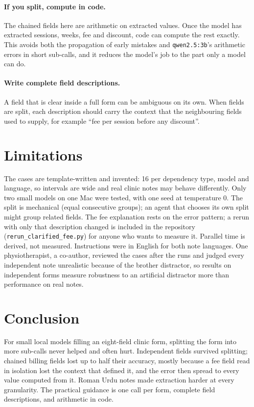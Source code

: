 \documentclass[11pt,a4paper]{article}
\newcommand{\code}[1]{\texttt{#1}}
\begin{document}
\paragraph{If you split, compute in code.} The chained fields here are arithmetic on extracted values. Once the model
has extracted sessions, weeks, fee and discount, code can compute the rest exactly. This avoids both the propagation of
early mistakes and \code{qwen2.5:3b}'s arithmetic errors in short sub-calls, and it reduces the model's job to the part
only a model can do.

\paragraph{Write complete field descriptions.} A field that is clear inside a full form can be ambiguous on its own.
When fields are split, each description should carry the context that the neighbouring fields used to supply, for
example ``fee per session before any discount''.

\section{Limitations}

The cases are template-written and invented: 16 per dependency type, model and language, so intervals are wide and
real clinic notes may behave differently. Only two small models on one Mac were tested, with one seed at temperature 0.
The split is mechanical (equal consecutive groups); an agent that chooses its own split might group related fields.
The fee explanation rests on the error pattern; a rerun with only that description changed is included in the
repository (\code{rerun\_clarified\_fee.py}) for anyone who wants to measure it.
Parallel time is derived, not measured. Instructions were in English for both note languages. One physiotherapist, a co-author, reviewed the
cases after the runs and judged every independent note unrealistic because of the brother distractor, so results on
independent forms measure robustness to an artificial distractor more than performance on real notes.

\section{Conclusion}

For small local models filling an eight-field clinic form, splitting the form into more sub-calls never helped and
often hurt. Independent fields survived splitting; chained billing fields lost up to half their accuracy, mostly
because a fee field read in isolation lost the context that defined it, and the error then spread to every value
computed from it. Roman Urdu notes made extraction harder at every granularity. The practical guidance is one call per
form, complete field descriptions, and arithmetic in code.
\end{document}
